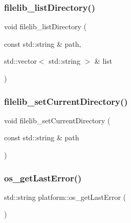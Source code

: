 \mbox{\label{namespaceplatform_acad9142fb05b5756d75b8f8a68b5558b}} 
\subsubsection{\texorpdfstring{filelib\+\_\+list\+Directory()}{filelib\_listDirectory()}}
{\footnotesize\ttfamily void filelib\+\_\+list\+Directory (\begin{DoxyParamCaption}\item[{const std\+::string \&}]{path,  }\item[{std\+::vector$<$ std\+::string $>$ \&}]{list }\end{DoxyParamCaption})}

\mbox{\label{namespaceplatform_afe79a966d14e3b8d08939712884fa9d3}} 
\subsubsection{\texorpdfstring{filelib\+\_\+set\+Current\+Directory()}{filelib\_setCurrentDirectory()}}
{\footnotesize\ttfamily void filelib\+\_\+set\+Current\+Directory (\begin{DoxyParamCaption}\item[{const std\+::string \&}]{path }\end{DoxyParamCaption})}

\mbox{\label{namespaceplatform_a33caced893c9dd544cd80f354c5ec359}} 
\subsubsection{\texorpdfstring{os\+\_\+get\+Last\+Error()}{os\_getLastError()}}
{\footnotesize\ttfamily std\+::string platform\+::os\+\_\+get\+Last\+Error (\begin{DoxyParamCaption}{ }\end{DoxyParamCaption})}

